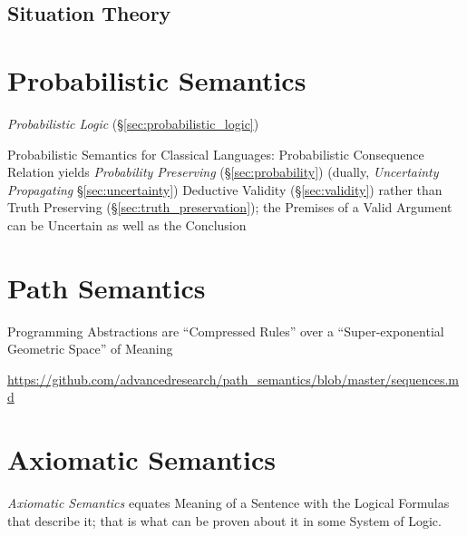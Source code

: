\subsection{Situation Theory}\label{sec:situation_theory}



\section{Probabilistic Semantics}\label{sec:probabilistic_semantics}

\fist \emph{Probabilistic Logic} (\S\ref{sec:probabilistic_logic})

Probabilistic Semantics for Classical Languages: Probabilistic Consequence
Relation yields \emph{Probability Preserving} (\S\ref{sec:probability}) (dually,
\emph{Uncertainty Propagating} \S\ref{sec:uncertainty}) Deductive Validity
(\S\ref{sec:validity}) rather than Truth Preserving
(\S\ref{sec:truth_preservation}); the Premises of a Valid Argument can be
Uncertain as well as the Conclusion



\section{Path Semantics}\label{sec:path_semantics}

Programming Abstractions are ``Compressed Rules'' over a
``Super-exponential Geometric Space'' of Meaning

\url{https://github.com/advancedresearch/path_semantics/blob/master/sequences.md}



\section{Axiomatic Semantics}\label{sec:axiomatic_semantics}

\emph{Axiomatic Semantics} equates Meaning of a Sentence with the
Logical Formulas that describe it; that is what can be proven about it
in some System of Logic.

